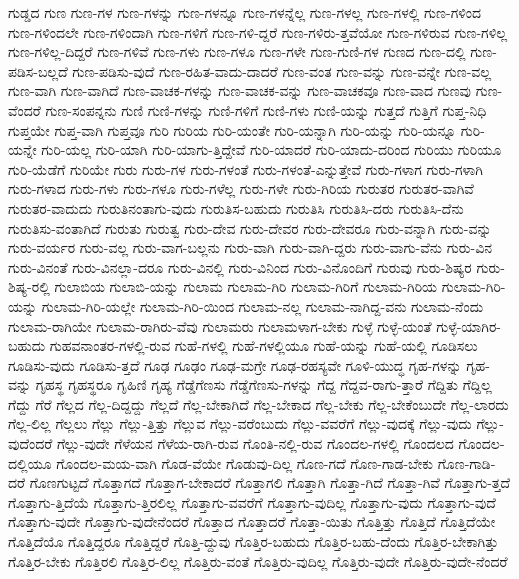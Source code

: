 {ಗುಡ್ಡದ
ಗುಣ
ಗುಣ-ಗಳ
ಗುಣ-ಗಳನ್ನು
ಗುಣ-ಗಳನ್ನೂ
ಗುಣ-ಗಳನ್ನೆಲ್ಲ
ಗುಣ-ಗಳಲ್ಲ
ಗುಣ-ಗಳಲ್ಲಿ
ಗುಣ-ಗಳಿಂದ
ಗುಣ-ಗಳಿಂದಲೇ
ಗುಣ-ಗಳಿಂದಾಗಿ
ಗುಣ-ಗಳಿಗೆ
ಗುಣ-ಗಳಿ-ದ್ದರೆ
ಗುಣ-ಗಳಿರು-ತ್ತವೆಯೋ
ಗುಣ-ಗಳಿರುವ
ಗುಣ-ಗಳಿಲ್ಲ
ಗುಣ-ಗಳಿಲ್ಲ-ದಿದ್ದರೆ
ಗುಣ-ಗಳಿವೆ
ಗುಣ-ಗಳು
ಗುಣ-ಗಳೂ
ಗುಣ-ಗಳೇ
ಗುಣ-ಗುಣಿ-ಗಳ
ಗುಣದ
ಗುಣ-ದಲ್ಲಿ
ಗುಣ-ಪಡಿಸ-ಬಲ್ಲದೆ
ಗುಣ-ಪಡಿಸು-ವುದೆ
ಗುಣ-ರಹಿತ-ವಾದು-ದಾದರೆ
ಗುಣ-ವಂತ
ಗುಣ-ವನ್ನು
ಗುಣ-ವನ್ನೇ
ಗುಣ-ವಲ್ಲ
ಗುಣ-ವಾಗಿ
ಗುಣ-ವಾಗಿದೆ
ಗುಣ-ವಾಚಕ-ಗಳನ್ನು
ಗುಣ-ವಾಚಕ-ವನ್ನು
ಗುಣ-ವಾಚಕವೂ
ಗುಣ-ವಾದ
ಗುಣವು
ಗುಣ-ವೆಂದರೆ
ಗುಣ-ಸಂಪನ್ನನು
ಗುಣಿ
ಗುಣಿ-ಗಳನ್ನು
ಗುಣಿ-ಗಳಿಗೆ
ಗುಣಿ-ಗಳು
ಗುಣಿ-ಯನ್ನು
ಗುತ್ತದೆ
ಗುತ್ತಿಗೆ
ಗುಪ್ತ-ನಿಧಿ
ಗುಪ್ತಯೇ
ಗುಪ್ತ-ವಾಗಿ
ಗುಪ್ತವೂ
ಗುರಿ
ಗುರಿಯ
ಗುರಿ-ಯಂತೇ
ಗುರಿ-ಯನ್ನಾಗಿ
ಗುರಿ-ಯನ್ನು
ಗುರಿ-ಯನ್ನೂ
ಗುರಿ-ಯನ್ನೇ
ಗುರಿ-ಯಲ್ಲ
ಗುರಿ-ಯಾಗಿ
ಗುರಿ-ಯಾಗು-ತ್ತಿದ್ದೇವೆ
ಗುರಿ-ಯಾದರೆ
ಗುರಿ-ಯಾದು-ದರಿಂದ
ಗುರಿಯು
ಗುರಿಯೂ
ಗುರಿ-ಯೆಡೆಗೆ
ಗುರಿಯೇ
ಗುರು
ಗುರು-ಗಳ
ಗುರು-ಗಳಂತೆ
ಗುರು-ಗಳಂತೆ-ಎನ್ನುತ್ತೇವೆ
ಗುರು-ಗಳಾಗ
ಗುರು-ಗಳಾಗಿ
ಗುರು-ಗಳಾದ
ಗುರು-ಗಳು
ಗುರು-ಗಳೂ
ಗುರು-ಗಳೆಲ್ಲ
ಗುರು-ಗಳೇ
ಗುರು-ಗಿರಿಯ
ಗುರುತರ
ಗುರುತರ-ವಾಗಿವೆ
ಗುರುತರ-ವಾದುದು
ಗುರುತಿನಂತಾಗು-ವುದು
ಗುರುತಿಸ-ಬಹುದು
ಗುರುತಿಸಿ
ಗುರುತಿಸಿ-ದರು
ಗುರುತಿಸಿ-ದೆನು
ಗುರುತಿಸು-ವಂತಾಗಿದೆ
ಗುರುತು
ಗುರುತ್ವ
ಗುರು-ದೇವ
ಗುರು-ದೇವರ
ಗುರು-ದೇವರೂ
ಗುರು-ವನ್ನಾಗಿ
ಗುರು-ವನ್ನು
ಗುರು-ವರ್ಯರ
ಗುರು-ವಲ್ಲ
ಗುರು-ವಾಗ-ಬಲ್ಲನು
ಗುರು-ವಾಗಿ
ಗುರು-ವಾಗಿ-ದ್ದರು
ಗುರು-ವಾಗು-ವೆನು
ಗುರು-ವಿನ
ಗುರು-ವಿನಂತೆ
ಗುರು-ವಿನಲ್ಲಾ-ದರೂ
ಗುರು-ವಿನಲ್ಲಿ
ಗುರು-ವಿನಿಂದ
ಗುರು-ವಿನೊಂದಿಗೆ
ಗುರುವು
ಗುರು-ಶಿಷ್ಯರ
ಗುರು-ಶಿಷ್ಯ-ರಲ್ಲಿ
ಗುಲಾಬಿಯ
ಗುಲಾಬಿ-ಯನ್ನು
ಗುಲಾಮ
ಗುಲಾಮ-ಗಿರಿ
ಗುಲಾಮ-ಗಿರಿಗೆ
ಗುಲಾಮ-ಗಿರಿಯ
ಗುಲಾಮ-ಗಿರಿ-ಯನ್ನು
ಗುಲಾಮ-ಗಿರಿ-ಯಲ್ಲೇ
ಗುಲಾಮ-ಗಿರಿ-ಯಿಂದ
ಗುಲಾಮ-ನಲ್ಲ
ಗುಲಾಮ-ನಾಗಿದ್ದ-ವನು
ಗುಲಾಮ-ನೆಂದು
ಗುಲಾಮ-ರಾಗಿಯೇ
ಗುಲಾಮ-ರಾಗಿರು-ವೆವು
ಗುಲಾಮರು
ಗುಲಾಮಳಾಗ-ಬೇಕು
ಗುಳ್ಳೆ
ಗುಳ್ಳೆ-ಯಂತೆ
ಗುಳ್ಳೆ-ಯಾಗಿರ-ಬಹುದು
ಗುಹವನಾಂತರ-ಗಳಲ್ಲಿ-ರುವ
ಗುಹೆ-ಗಳಲ್ಲಿ
ಗುಹೆ-ಗಳಲ್ಲಿಯೂ
ಗುಹೆ-ಯನ್ನು
ಗುಹೆ-ಯಲ್ಲಿ
ಗೂಡಿಸಲು
ಗೂಡಿಸು-ವುದು
ಗೂಡಿಸು-ತ್ತದೆ
ಗೂಢ
ಗೂಢಂ
ಗೂಢ-ಮಗ್ರೇ
ಗೂಢ-ರಹಸ್ಯವೇ
ಗೂಳಿ-ಯುದ್ಧ
ಗೃಹ-ಗಳನ್ನು
ಗೃಹ-ವನ್ನು
ಗೃಹಸ್ಥ
ಗೃಹಸ್ಥರೂ
ಗೃಹಿಣಿ
ಗೃಹ್ಯ
ಗೆಡ್ಡೆಗೆಣಸು
ಗೆಡ್ಡೆಗೆಣಸು-ಗಳನ್ನು
ಗೆದ್ದ
ಗೆದ್ದವ-ರಾಗು-ತ್ತಾರೆ
ಗೆದ್ದಿತು
ಗೆದ್ದಿಲ್ಲ
ಗೆದ್ದು
ಗೆರೆ
ಗೆಲ್ಲದ
ಗೆಲ್ಲ-ದಿದ್ದದ್ದು
ಗೆಲ್ಲದೆ
ಗೆಲ್ಲ-ಬೇಕಾಗಿದೆ
ಗೆಲ್ಲ-ಬೇಕಾದ
ಗೆಲ್ಲ-ಬೇಕು
ಗೆಲ್ಲ-ಬೇಕೆಂಬುದೇ
ಗೆಲ್ಲ-ಲಾರದು
ಗೆಲ್ಲ-ಲಿಲ್ಲ
ಗೆಲ್ಲಲು
ಗೆಲ್ಲು
ಗೆಲ್ಲು-ತ್ತಿತ್ತು
ಗೆಲ್ಲುವ
ಗೆಲ್ಲು-ವರೆಂಬುದು
ಗೆಲ್ಲು-ವವರೆಗೆ
ಗೆಲ್ಲು-ವುದಕ್ಕೆ
ಗೆಲ್ಲು-ವುದು
ಗೆಲ್ಲು-ವುದೆಂದರೆ
ಗೆಲ್ಲು-ವುದೇ
ಗೆಳೆಯನ
ಗೆಳೆಯ-ರಾಗಿ-ರುವ
ಗೊಂತಿ-ನಲ್ಲಿ-ರುವ
ಗೊಂದಲ-ಗಳಲ್ಲಿ
ಗೊಂದಲದ
ಗೊಂದಲ-ದಲ್ಲಿಯೂ
ಗೊಂದಲ-ಮಯ-ವಾಗಿ
ಗೊಡ-ವೆಯೇ
ಗೊಡುವು-ದಿಲ್ಲ
ಗೊಣ-ಗದೆ
ಗೊಣ-ಗಾಡ-ಬೇಕು
ಗೊಣ-ಗಾಡಿ-ದರೆ
ಗೊಣಗುಟ್ಟದೆ
ಗೊತ್ತಾಗದೆ
ಗೊತ್ತಾಗ-ಬೇಕಾದರೆ
ಗೊತ್ತಾಗಲಿ
ಗೊತ್ತಾಗಿ
ಗೊತ್ತಾ-ಗಿದೆ
ಗೊತ್ತಾ-ಗಿವೆ
ಗೊತ್ತಾಗು-ತ್ತದೆ
ಗೊತ್ತಾಗು-ತ್ತಿದೆಯೆ
ಗೊತ್ತಾಗು-ತ್ತಿರಲಿಲ್ಲ
ಗೊತ್ತಾಗು-ವವರೆಗೆ
ಗೊತ್ತಾಗು-ವುದಿಲ್ಲ
ಗೊತ್ತಾಗು-ವುದು
ಗೊತ್ತಾಗು-ವುದೆ
ಗೊತ್ತಾಗು-ವುದೇ
ಗೊತ್ತಾಗು-ವುದೇನೆಂದರೆ
ಗೊತ್ತಾದ
ಗೊತ್ತಾದರೆ
ಗೊತ್ತಾ-ಯಿತು
ಗೊತ್ತಿತ್ತು
ಗೊತ್ತಿದೆ
ಗೊತ್ತಿದೆಯೇ
ಗೊತ್ತಿದೆಯೊ
ಗೊತ್ತಿದ್ದರೂ
ಗೊತ್ತಿದ್ದರೆ
ಗೊತ್ತಿ-ದ್ದುವು
ಗೊತ್ತಿರ-ಬಹುದು
ಗೊತ್ತಿರ-ಬಹು-ದೆಂದು
ಗೊತ್ತಿರ-ಬೇಕಾಗಿತ್ತು
ಗೊತ್ತಿರ-ಬೇಕು
ಗೊತ್ತಿರಲಿ
ಗೊತ್ತಿರ-ಲಿಲ್ಲ
ಗೊತ್ತಿರು-ವಂತೆ
ಗೊತ್ತಿರು-ವುದಿಲ್ಲ
ಗೊತ್ತಿರು-ವುದೇ
ಗೊತ್ತಿರು-ವುದೇ-ನೆಂದರೆ
}
